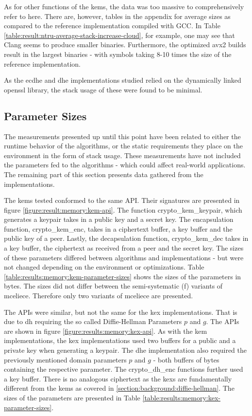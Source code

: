 As for other functions of the \glspl{kem}, the data was too massive to comprehensively refer to here. There are, however, tables in the appendix for average sizes as compared to the reference implementation compiled with GCC. In Table \ref{table:result:ntru-average-stack-increase-cloud}, for example, one may see that Clang seems to produce smaller binaries. Furthermore, the optimized \gls{avx2} builds result in the largest binaries - with symbols taking 8-10 times the size of the reference implementation.

As the \gls{ecdhe} and \gls{dhe} implementations studied relied on the dynamically linked \gls{openssl} library, the stack usage of these were found to be minimal.

\subsection{Parameter Sizes}

The measurements presented up until this point have been related to either the runtime behavior of the algorithms, or the static requirements they place on the environment in the form of stack usage. These measurements have not included the parameters fed to the algorithms - which could affect real-world applications. The remaining part of this section presents data gathered from the implementations.

The \glspl{kem} tested conformed to the same API. Their signatures are presented in figure \ref{figure:result:memory:kem-api}. The function crypto\_kem\_keypair, which generates a keypair takes in a public key and a secret key. The encapsulation function, crypto\_kem\_enc, takes in a ciphertext buffer, a key buffer and the public key of a peer. Lastly, the decapsulation function, crypto\_kem\_dec takes in a key buffer, the ciphertext as received from a peer and the secret key. The sizes of these parameters differed between algorithms and implementations - but were not changed depending on the environment or optimizations. Table \ref{table:results:memory:kem-parameter-sizes} shows the sizes of the parameters in bytes. The sizes did not differ between the semi-systematic (f) variants of \gls{mceliece}. Therefore only two variants of \gls{mceliece} are presented.

The APIs were similar, but not the same for the \gls{kex} implementations. That is due to \gls{dh} requiring the so called Diffie-Hellman Parameters $p$ and $g$. The APIs are shown in figure \ref{figure:results:memory:kex-api}. As with the \gls{kem} implementations, the \gls{kex} implementations used two buffers for a public and a private key when generating a keypair. The \gls{dhe} implementation also required the previously mentioned domain parameters $p$ and $g$ - both buffers of bytes containing the respective parameter. The crypto\_dh\_enc functions further used a key buffer. There is no analogous ciphertext as the \glspl{kex} are fundamentally different from the \glspl{kem} as covered in \ref{section:background:diffie-hellman}. The sizes of the parameters are presented in Table \ref{table:results:memory:kex-parameter-sizes}.

